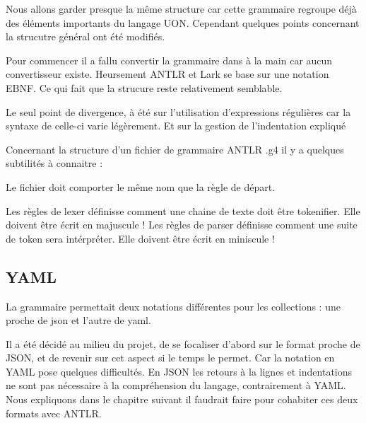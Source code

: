 \documentclass[
    iict, %
    il, %
]{heig-tb}
\begin{document}
Nous allons garder presque la même structure car cette grammaire regroupe déjà des éléments importants du langage UON.
Cependant quelques points concernant la strucutre général ont été modifiés.

Pour commencer il a fallu convertir la grammaire dans à la main car aucun convertisseur existe. Heursement ANTLR et Lark se base sur une notation EBNF.
Ce qui fait que la strucure reste relativement semblable.

Le seul point de divergence, à été sur l'utilisation d'expressions régulières car la syntaxe de celle-ci varie légèrement. Et sur la gestion de l'indentation expliqué %

Concernant la structure d'un fichier de grammaire ANTLR .g4 il y a quelques subtilités à connaitre :

Le fichier doit comporter le même nom que la règle de départ. %

Les règles de lexer définisse comment une chaine de texte doit être tokenifier. Elle doivent être écrit en majuscule !
Les règles de parser définisse comment une suite de token sera intérpréter. Elle doivent être écrit en miniscule !







\subsection{YAML}
La grammaire permettait deux notations différentes pour les collections : une proche de json et l'autre de yaml.


Il a été décidé au milieu du projet, de se focaliser d'abord sur le format proche de JSON, et de revenir sur cet aspect si le temps le permet.
Car la notation en YAML pose quelques difficultés. %
En JSON les retours à la lignes et indentations ne sont pas nécessaire à la compréhension du langage, contrairement à YAML.
Nous expliquons dans le chapitre suivant il faudrait faire pour cohabiter ces deux formats avec ANTLR. %
\end{document}
